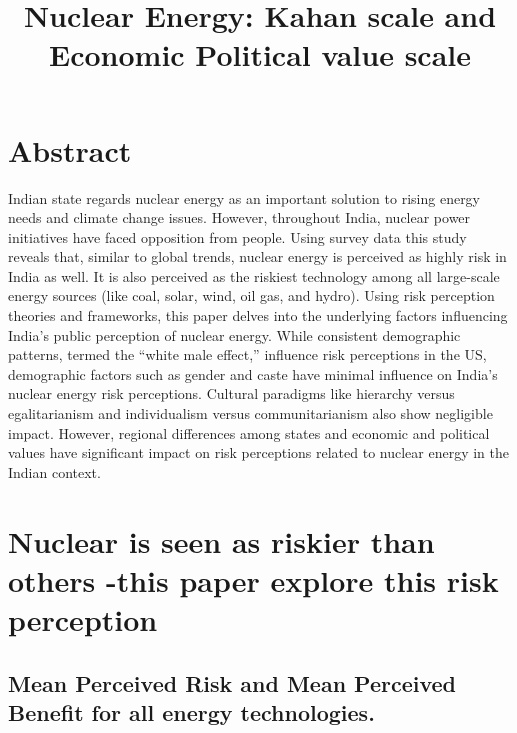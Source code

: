 \documentclass[
]{article}
\title{Nuclear Energy: Kahan scale and Economic Political value scale}
\author{}
\date{\vspace{-2.5em}}
\begin{document}
\maketitle

{
\setcounter{tocdepth}{2}
\tableofcontents
}
\newpage

\hypertarget{abstract}{%
\section{Abstract}\label{abstract}}

Indian state regards nuclear energy as an important solution to rising
energy needs and climate change issues. However, throughout India,
nuclear power initiatives have faced opposition from people. Using
survey data this study reveals that, similar to global trends, nuclear
energy is perceived as highly risk in India as well. It is also
perceived as the riskiest technology among all large-scale energy
sources (like coal, solar, wind, oil gas, and hydro). Using risk
perception theories and frameworks, this paper delves into the
underlying factors influencing India's public perception of nuclear
energy. While consistent demographic patterns, termed the ``white male
effect,'' influence risk perceptions in the US, demographic factors such
as gender and caste have minimal influence on India's nuclear energy
risk perceptions. Cultural paradigms like hierarchy versus
egalitarianism and individualism versus communitarianism also show
negligible impact. However, regional differences among states and
economic and political values have significant impact on risk
perceptions related to nuclear energy in the Indian context.

\newpage

\hypertarget{nuclear-is-seen-as-riskier-than-others--this-paper-explore-this-risk-perception}{%
\section{Nuclear is seen as riskier than others -this paper explore this
risk
perception}\label{nuclear-is-seen-as-riskier-than-others--this-paper-explore-this-risk-perception}}

\hypertarget{mean-perceived-risk-and-mean-perceived-benefit-for-all-energy-technologies.}{%
\subsection{Mean Perceived Risk and Mean Perceived Benefit for all
energy
technologies.}\label{mean-perceived-risk-and-mean-perceived-benefit-for-all-energy-technologies.}}
\end{document}
